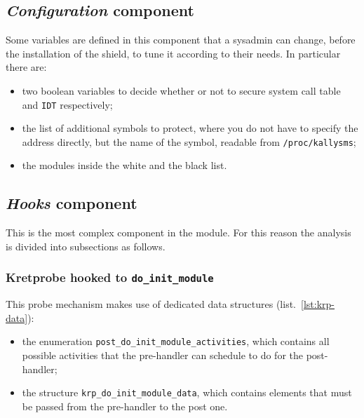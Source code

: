\documentclass{article}
\begin{document}
	\subsection{\emph{Configuration} component}\label{sec:config}
	Some variables are defined in this component that a sysadmin can change, before the installation of the
	shield, to tune it according to their needs. In particular there are:
	\begin{itemize}
		\item two boolean variables to decide whether or not to secure system call table and \texttt{IDT} respectively;
		\item the list of additional symbols to protect, where you do not have to specify the address directly,
		but the name of the symbol, readable from \texttt{/proc/kallysms};
		\item the modules inside the white and the black list.
	\end{itemize}

	\subsection{\emph{Hooks} component}\label{sec:hooks}
	This is the most complex component in the module. For this reason the analysis is divided into subsections as
	follows.

	\subsubsection{Kretprobe hooked to \texttt{do\_init\_module}}
	This probe mechanism makes use of dedicated data structures (list.~\ref{lst:krp-data}):
	\begin{itemize}
		\item the enumeration \texttt{post\_do\_init\_module\_activities}, which contains all possible activities that
		the pre-handler can schedule to do for the post-handler;
		\item the structure \texttt{krp\_do\_init\_module\_data}, which contains elements that must be passed from the
		pre-handler to the post one.
	\end{itemize}
\end{document}
